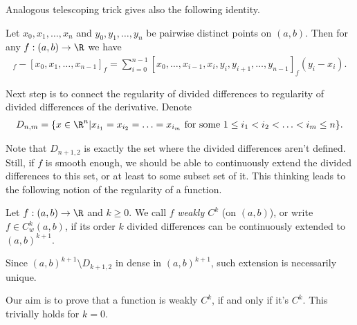 Analogous telescoping trick gives also the following identity.
\begin{prop}\label{total_derivative}
	Let $x_{0}, x_{1}, \ldots, x_{n}$ and $y_{0}, y_{1}, \ldots, y_{n}$ be pairwise distinct points on $(a, b)$. Then for any $f : (a, b) \to \R$ we have
	\begin{align}
		[y_{0}, y_{1}, \ldots, y_{n - 1}]_{f} - [x_{0}, x_{1}, \ldots, x_{n - 1}]_{f} = \sum_{i = 0}^{n - 1} [x_{0}, \ldots, x_{i - 1}, x_{i}, y_{i}, y_{i + 1}, \ldots, y_{n - 1}]_{f} (y_{i} - x_{i}).
	\end{align}
\end{prop}

Next step is to connect the regularity of divided differences to regularity of divided differences of the derivative. Denote
\begin{align*}
	D_{n, m} = \{x \in \R^{n} | x_{i_{1}} = x_{i_{2}} = \ldots = x_{i_{m}} \text{ for some $1 \leq i_{1} < i_{2} < \ldots < i_{m} \leq n$} \}.
\end{align*}

Note that $D_{n + 1, 2}$ is exactly the set where the divided differences aren't defined. Still, if $f$ is smooth enough, we should be able to continuously extend the divided differences to this set, or at least to some subset set of it. This thinking leads to the following notion of the regularity of a function.

\begin{maar}
	Let $f : (a, b) \to \R$ and $k \geq 0$. We call $f$ \textit{weakly $C^{k}$} (on $(a, b)$), or write $f \in C_{w}^{k}(a, b)$, if its order $k$ divided differences can be continuously extended to $(a, b)^{k + 1}$.
\end{maar}

Since $(a, b)^{k + 1} \setminus D_{k + 1, 2}$ in dense in $(a, b)^{k + 1}$, such extension is necessarily unique.

Our aim is to prove that a function is weakly $C^{k}$, if and only if it's $C^{k}$. This trivially holds for $k = 0$.

